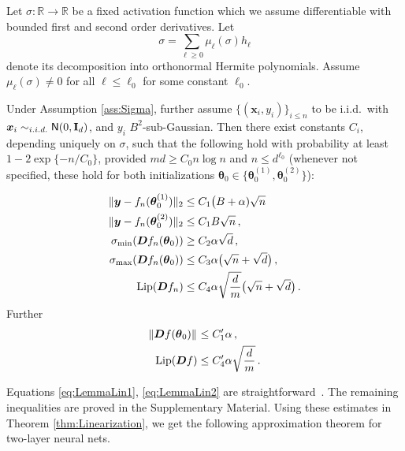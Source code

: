 \begin{assumption}\label{ass:Sigma}
Let $\sigma:{\mathbb R}\to{\mathbb R}$ be a fixed activation function which we assume differentiable with bounded first and second order derivatives. Let $$\sigma = \sum_{\ell\ge 0}\mu_{\ell}(\sigma)h_{\ell}$$ denote its decomposition into orthonormal Hermite polynomials. Assume 
  $\mu_{\ell}(\sigma)\neq 0$ for all $\ell\le \ell_0$ for some constant $\ell_0$.
\end{assumption}

\begin{lemma}\label{lemma:TwoLayers}
  Under Assumption \ref{ass:Sigma},  further assume
 $\{({\boldsymbol x}_i,y_i)\}_{i\le n}$ to be i.i.d.\ with ${\boldsymbol x}_i
 \sim_{i.i.d.}{\sf N}(0,{\mathbf I}_d)$,  and  $y_i$ $B^2$-sub-Gaussian. Then there exist constants $C_i$, depending uniquely on $\sigma$, such that the following hold with probability at least $1-2\exp\{-n/C_0\}$,
  provided $md\ge C_0 n\log n$ and $n\le d^{\ell_0}$ (whenever not specified, these hold for both  initializations
  ${\boldsymbol \theta}_0\in\{{\boldsymbol \theta}_0^{(1)},{\boldsymbol \theta}_0^{(2)}\}$):

  \begin{align}
    \|{\boldsymbol y}-f_n({\boldsymbol \theta}^{(1)}_0)\|_2 & \le C_1\big(B+\alpha)\sqrt{n}\, \label{eq:LemmaLin1}\\
                         \|{\boldsymbol y}-f_n({\boldsymbol \theta}^{(2)}_0)\|_2 & \le C_1B\sqrt{n}\, , \label{eq:LemmaLin2}\\ 
    \sigma_{\min}({\boldsymbol D} f_n({\boldsymbol \theta}_0)) &\ge C_2\alpha \sqrt{d}\, , \label{eq:LemmaLin3}\\
    \sigma_{\max}({\boldsymbol D} f_n({\boldsymbol \theta}_0)) &\le C_3\alpha \big(\sqrt{n}+\sqrt{d}\big)\, , \label{eq:LemmaLin4}\\
    {\rm Lip}({\boldsymbol D} f_n) & \le C_4\alpha\sqrt{\frac{d}{m}}\big(\sqrt{n}+\sqrt{d}\big)\, . \label{eq:LemmaLin5}
  \end{align}
  Further
  \begin{align}
    \|{\boldsymbol D} f({\boldsymbol \theta}_0)\|_{}& \le C_1'\alpha\, , \label{eq:LemmaLin6}\\
    {\rm Lip}({\boldsymbol D} f) & \le    C_4' \alpha\sqrt{\frac{d}{m}}\, . \label{eq:LemmaLin7}
  \end{align}
  \end{lemma}

Equations \eqref{eq:LemmaLin1}, \eqref{eq:LemmaLin2} are straightforward~\cite{oymak2019overparameterized}. The remaining inequalities are proved in the Supplementary Material. Using these estimates in Theorem \ref{thm:Linearization}, we get the following approximation theorem for two-layer neural nets.


